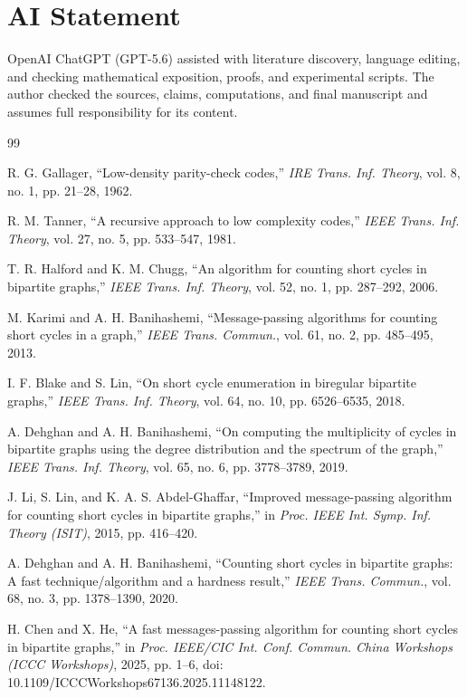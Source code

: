 \documentclass[conference]{IEEEtran}
\begin{document}
\section*{AI Statement}
OpenAI ChatGPT (GPT-5.6) assisted with literature discovery, language editing,
and checking mathematical exposition, proofs, and experimental scripts.  The author checked the sources, claims, computations, and final
manuscript and assumes full responsibility for its content.

\begin{thebibliography}{99}

R. G. Gallager, ``Low-density parity-check codes,''
\emph{IRE Trans. Inf. Theory}, vol. 8, no. 1,
pp. 21--28, 1962.

R. M. Tanner, ``A recursive approach to low complexity codes,''
\emph{IEEE Trans. Inf. Theory}, vol. 27, no. 5,
pp. 533--547, 1981.

T. R. Halford and K. M. Chugg,
``An algorithm for counting short cycles in bipartite graphs,''
\emph{IEEE Trans. Inf. Theory}, vol. 52, no. 1,
pp. 287--292, 2006.

M. Karimi and A. H. Banihashemi,
``Message-passing algorithms for counting short cycles in a graph,''
\emph{IEEE Trans. Commun.}, vol. 61, no. 2,
pp. 485--495, 2013.

I. F. Blake and S. Lin,
``On short cycle enumeration in biregular bipartite graphs,''
\emph{IEEE Trans. Inf. Theory}, vol. 64, no. 10,
pp. 6526--6535, 2018.

A. Dehghan and A. H. Banihashemi,
``On computing the multiplicity of cycles in bipartite graphs
using the degree distribution and the spectrum of the graph,''
\emph{IEEE Trans. Inf. Theory}, vol. 65, no. 6,
pp. 3778--3789, 2019.

J. Li, S. Lin, and K. A. S. Abdel-Ghaffar,
``Improved message-passing algorithm for counting short cycles
in bipartite graphs,''
in \emph{Proc. IEEE Int. Symp. Inf. Theory (ISIT)},
2015, pp. 416--420.

A. Dehghan and A. H. Banihashemi,
``Counting short cycles in bipartite graphs:
A fast technique/algorithm and a hardness result,''
\emph{IEEE Trans. Commun.}, vol. 68, no. 3,
pp. 1378--1390, 2020.

H. Chen and X. He,
``A fast messages-passing algorithm for counting short cycles
in bipartite graphs,''
in \emph{Proc. IEEE/CIC Int. Conf. Commun. China Workshops
(ICCC Workshops)}, 2025, pp. 1--6,
doi: 10.1109/ICCCWorkshops67136.2025.11148122.


\end{thebibliography}
\end{document}
